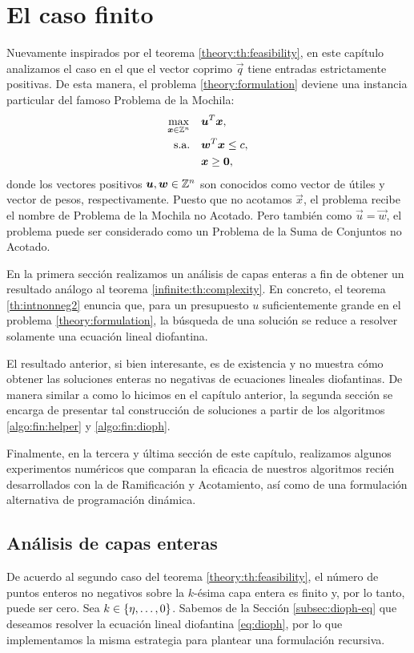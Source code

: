 \chapter{El caso finito}
\noindent
Nuevamente inspirados por el teorema \ref{theory:th:feasibility}, en este capítulo analizamos el
caso en el que el vector coprimo $\vec{q}$ tiene entradas estrictamente positivas. De esta manera,
el problema \eqref{theory:formulation} deviene una instancia particular del famoso Problema de la
Mochila:
\begin{subequations}
	\label{knapsack-formulation}
	\begin{align}
		\max_{\boldsymbol{x} \in \mathbb{Z}^n} \quad
			& \boldsymbol{u}^T\boldsymbol{x}, \\
		\text{s.a.} \quad
			& \boldsymbol{w}^T\boldsymbol{x} \leq c, \\
			& \boldsymbol{x} \geq \boldsymbol{0},
	\end{align}
\end{subequations}
donde los vectores positivos $\boldsymbol{u}, \boldsymbol{w} \in \mathbb{Z}^n$ son conocidos como vector de útiles y
vector de pesos, respectivamente. Puesto que no acotamos $\vec{x}$, el problema recibe el nombre de
Problema de la Mochila no Acotado. Pero también como $\vec{u} = \vec{w}$, el problema puede
ser considerado como un Problema de la Suma de Conjuntos no Acotado.

En la primera sección realizamos un análisis de capas enteras a fin de obtener un resultado análogo
al teorema \ref{infinite:th:complexity}. En concreto, el teorema \ref{th:intnonneg2} enuncia que,
para un presupuesto $u$ suficientemente grande en el problema \eqref{theory:formulation}, la
búsqueda de una solución se reduce a resolver solamente una ecuación lineal diofantina.

El resultado anterior, si bien interesante, es de existencia y no muestra cómo obtener las
soluciones enteras no negativas de ecuaciones lineales diofantinas. De manera similar a como lo
hicimos en el capítulo anterior, la segunda sección se encarga de presentar tal construcción de
soluciones a partir de los algoritmos \ref{algo:fin:helper} y \ref{algo:fin:dioph}.

Finalmente, en la tercera y última sección de este capítulo, realizamos algunos experimentos
numéricos que comparan la eficacia de nuestros algoritmos recién desarrollados con la de
Ramificación y Acotamiento, así como de una formulación alternativa de programación dinámica.

\section{Análisis de capas enteras}
\noindent
De acuerdo al segundo caso del teorema \ref{theory:th:feasibility}, el número de puntos enteros no
negativos sobre la $k$-ésima capa entera es finito y, por lo tanto, puede ser cero. Sea $k \in
\lbrace \eta, \ldots, 0 \rbrace$. Sabemos de la Sección \ref{subsec:dioph-eq} que deseamos resolver la
ecuación lineal diofantina \eqref{eq:dioph}, por lo que implementamos la misma estrategia para
plantear una formulación recursiva. 

